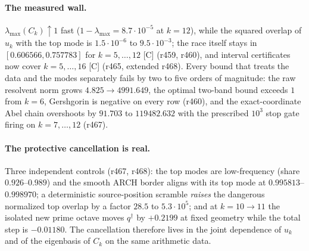 \documentclass[11pt]{article}
\theoremstyle{remark}
\newcommand{\qdag}{q^{\dagger}}
\newcommand{\Cgrade}{\textnormal{\small[C]}}
\begin{document}
\paragraph{The measured wall.}
$\lambda_{\max}(C_k)\uparrow1$ fast
($1-\lambda_{\max}=8.7\cdot10^{-5}$ at $k=12$), while the squared
overlap of $u_k$ with the top mode is
$1.5\cdot10^{-6}$ to $9.5\cdot10^{-3}$; the race itself stays in
$[0.606566,0.757783]$ for $k=5,\dots,12$ \Cgrade{} (r459, r460), and
interval certificates now cover $k=5,\dots,16$ \Cgrade{} (r465,
extended r468).  Every bound that treats the data and the modes
separately fails by two to five orders of magnitude: the raw
resolvent norm grows $4.825\to4991.649$, the optimal two-band bound
exceeds $1$ from $k=6$, Gershgorin is negative on every row (r460),
and the exact-coordinate Abel chain overshoots by
$91.703$ to $119482.632$ with the prescribed $10^{3}$ stop gate
firing on $k=7,\dots,12$ (r467).

\paragraph{The protective cancellation is real.}
Three independent controls (r467, r468):
the top modes are low-frequency (share $0.926$--$0.989$) and the
smooth ARCH border aligns with its top mode at
$0.995813$--$0.998970$; a deterministic source-position scramble
\emph{raises} the dangerous normalized top overlap by a factor
$28.5$ to $5.3\cdot10^{5}$; and at $k=10\to11$ the isolated new
prime octave moves $\qdag$ by $+0.2199$ at fixed geometry while the
total step is $-0.01180$.  The cancellation therefore lives in the
joint dependence of $u_k$ and of the eigenbasis of $C_k$ on the same
arithmetic data.
\end{document}
